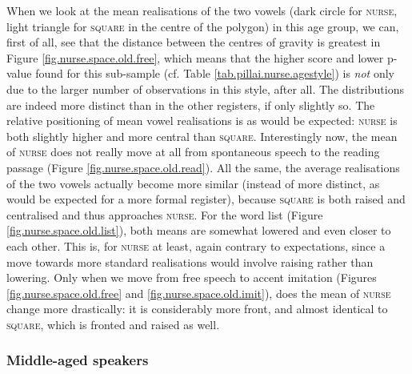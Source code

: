 When we look at the mean realisations of the two vowels (dark circle for \textsc{nurse}, light triangle for \textsc{square} in the centre of the polygon) in this age group, we can, first of all, see that the distance between the centres of gravity is greatest in Figure \ref{fig.nurse.space.old.free}, which means that the higher  score and lower p-value found for this sub-sample (cf. Table \ref{tab.pillai.nurse.agestyle}) is \emph{not} only due to the larger number of observations in this style, after all.
The distributions are indeed more distinct than in the other registers, if only slightly so.
The relative positioning of mean vowel realisations is as would be expected: \textsc{nurse} is both slightly higher and more central than \textsc{square}.
Interestingly now, the mean of \textsc{nurse} does not really move at all from spontaneous speech to the reading passage (Figure \ref{fig.nurse.space.old.read}).
All the same, the average realisations of the two vowels actually become more similar (instead of more distinct, as would be expected for a more formal register), because \textsc{square} is both raised and centralised and thus approaches \textsc{nurse}.
For the word list (Figure \ref{fig.nurse.space.old.list}), both means are somewhat lowered and even closer to each other.
This is, for \textsc{nurse} at least, again contrary to expectations, since a move towards more standard realisations would involve raising rather than lowering.
Only when we move from free speech to accent imitation (Figures \ref{fig.nurse.space.old.free} and \ref{fig.nurse.space.old.imit}), does the mean of \textsc{nurse} change more drastically: it is considerably more front, and almost identical to \textsc{square}, which is fronted and raised as well.

\subsubsection{Middle-aged speakers}


